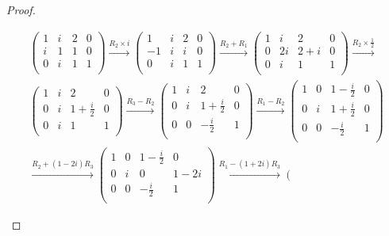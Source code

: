 \begin{proof}
\begin{parts}
			\begin{gather*}
			\left(
\begin{array}{ccc|c}
 1 & i & 2 & 0 \\
 i & 1 & 1 & 0 \\
 0 & i & 1 & 1 \\
\end{array}
\right) \xrightarrow{R_2\times i} \left(
\begin{array}{ccc|c}
 1 & i & 2 & 0 \\
 -1 & i & i & 0 \\
 0 & i & 1 & 1 \\
\end{array}
\right) \xrightarrow{R_2+R_1} \left(
\begin{array}{ccc|c}
 1 & i & 2 & 0 \\
 0 & 2 i & 2+i & 0 \\
 0 & i & 1 & 1 \\
\end{array}
\right) \xrightarrow{R_2\times \frac{1}{2}}\\ \left(
\begin{array}{ccc|c}
 1 & i & 2 & 0 \\
 0 & i & 1+\frac{i}{2} & 0 \\
 0 & i & 1 & 1 \\
\end{array}
\right) \xrightarrow{R_3-R_2} \left(
\begin{array}{ccc|c}
 1 & i & 2 & 0 \\
 0 & i & 1+\frac{i}{2} & 0 \\
 0 & 0 & -\frac{i}{2} & 1 \\
\end{array}
\right) \xrightarrow{R_1-R_2} \left(
\begin{array}{ccc|c}
 1 & 0 & 1-\frac{i}{2} & 0 \\
 0 & i & 1+\frac{i}{2} & 0 \\
 0 & 0 & -\frac{i}{2} & 1 \\
\end{array}
\right)\\ \xrightarrow{R_2+(1-2i)R_3} \left(
\begin{array}{ccc|c}
 1 & 0 & 1-\frac{i}{2} & 0 \\
 0 & i & 0 & 1-2 i \\
 0 & 0 & -\frac{i}{2} & 1 \\
\end{array}
\right) \xrightarrow{R_1-(1+2 i)R_3} \left(
\begin{array}{ccc|c}

\end{array}
\end{gather*}
\end{parts}
\end{proof}
